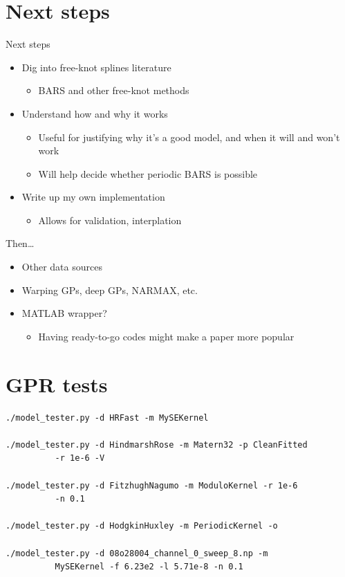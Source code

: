 \documentclass[presentation]{beamer}
\begin{document}
\section{Next steps}
\label{sec:org1886949}
\begin{frame}[label={sec:org74af6b3}]{Next steps}
\begin{itemize}[<+->]
\item Dig into free-knot splines literature
\begin{itemize}
\item BARS and other free-knot methods
\end{itemize}
\item Understand how and why it works
\begin{itemize}
\item Useful for justifying why it's a good model, and when it will and won't work
\item Will help decide whether periodic BARS is possible
\end{itemize}
\item Write up my own implementation
\begin{itemize}
\item Allows for validation, interplation
\end{itemize}
\end{itemize}

Then\ldots{}
\begin{itemize}[<+->]
\item Other data sources
\item Warping GPs, deep GPs, NARMAX, etc.
\item MATLAB wrapper?
\begin{itemize}
\item Having ready-to-go codes might make a paper more popular
\end{itemize}
\end{itemize}
\end{frame}


\section{GPR tests}
\label{sec:org9b87f56}

\begin{verbatim}
./model_tester.py -d HRFast -m MySEKernel

./model_tester.py -d HindmarshRose -m Matern32 -p CleanFitted 
		  -r 1e-6 -V

./model_tester.py -d FitzhughNagumo -m ModuloKernel -r 1e-6 
		  -n 0.1

./model_tester.py -d HodgkinHuxley -m PeriodicKernel -o

./model_tester.py -d 08o28004_channel_0_sweep_8.np -m 
		  MySEKernel -f 6.23e2 -l 5.71e-8 -n 0.1
\end{verbatim}
\end{document}

